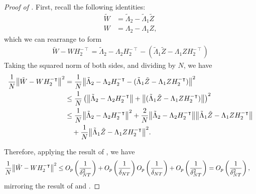 \documentclass[12pt]{article}
\newcommand*{\tran}{\intercal}
\theoremstyle{plain}
\numberwithin{equation}{section}
\begin{document}
\begin{proof}[Proof of ]
First, recall the following identities:
\begin{align}
\tilde{W} &= \tilde{\Lambda}_2 - \tilde{\Lambda}_1 \tilde{Z} \\
W &= \Lambda_2 - \Lambda_1 Z,
\end{align}
which we can rearrange to form
\begin{align}
\tilde{W} - W H_2^{- \tran} = 
\tilde{\Lambda}_2 - \Lambda_2 H_2^{- \tran} - 
(\tilde{\Lambda}_1 \tilde{Z} - \Lambda_1 Z H_2^{- \tran})
\end{align}
Taking the squared norm of both sides, and dividing by $N$, we have
\begin{align*}
\frac{1}{N} \norm{\tilde{W} - W H_2^{- \tran}}^2 
&= 
\frac{1}{N} \norm{\tilde{\Lambda}_2 - \Lambda_2 H_2^{- \tran} - 
(\tilde{\Lambda}_1 \tilde{Z} - \Lambda_1 Z H_2^{- \tran})}^2 \\
&\leq \frac{1}{N} \left( 
\norm{\tilde{\Lambda}_2 - \Lambda_2 H_2^{- \tran}} +
\norm{(\tilde{\Lambda}_1 \tilde{Z} - \Lambda_1 Z H_2^{- \tran})}
\right)^2 \\
&\leq 
\frac{1}{N} \norm{\tilde{\Lambda}_2 - \Lambda_{2} H_2^{- \tran}}^2 +
\frac{2}{N} 
\norm{\tilde{\Lambda}_2 - \Lambda_2 H_2^{- \tran}} 
\norm{\tilde{\Lambda}_1 \tilde{Z} - \Lambda_1 Z H_2^{- \tran}} \\
&\quad + 
\frac{1}{N} 
\norm{\tilde{\Lambda}_1 \tilde{Z} - \Lambda_1 Z H_2^{- \tran}}^2.
\end{align*}

Therefore, applying the result of , we have 
\begin{align}
\frac{1}{N} \norm{\tilde{W} - W H_2^{- \tran}}^2 
&\leq \Opdeltasq + \Opdelta \Opdelta + \Opdeltasq = \Opdeltasq,
\end{align}
mirroring the result of \textcite{bai_inferential_2003} and \textcite{bai_simpler_2020}.
\end{proof}

\end{document}

